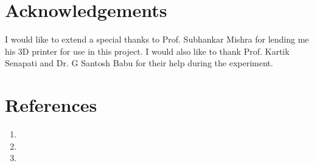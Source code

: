 \documentclass{double}
\begin{document}
\begin{multicols*}{2}
\section{Acknowledgements}
I would like to extend a special thanks to Prof. Subhankar Mishra for lending me his 3D printer for use in this project. I would also like to thank Prof. Kartik Senapati and Dr. G Santosh Babu for their help during the experiment.

\section{References}
\begin{enumerate}
	\item {}
	\item {}
	\item {}
\end{enumerate}
\end{multicols*}
\clearpage
\end{document}
